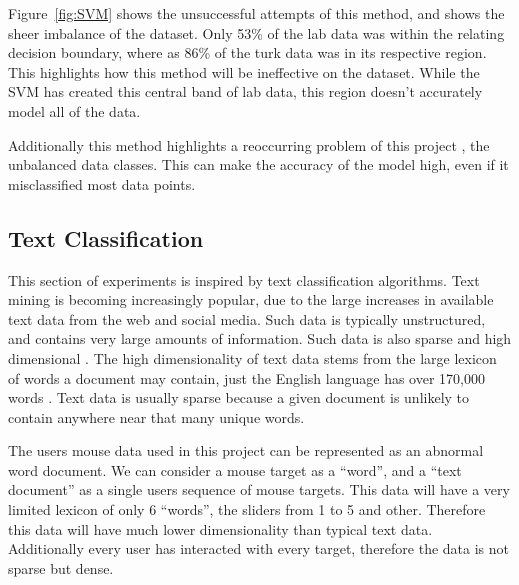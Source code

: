 \documentclass{article}
\begin{document}
Figure~\ref{fig:SVM} shows the unsuccessful attempts of this method, and shows the sheer imbalance of the dataset.
Only 53\% of the lab data was within the relating decision boundary, where as 86\% of the turk data was in its respective region.
This highlights how this method will be ineffective on the dataset.
While the SVM has created this central band of lab data, this region doesn't accurately model all of the data. 

Additionally this method highlights a reoccurring problem of this project
, the unbalanced data classes.
This can make the accuracy of the model high, even if it misclassified most data points.




\subsection{Text Classification}


This section of experiments is inspired by text classification algorithms.
Text mining is becoming increasingly popular, due to the large increases in available text data from the web and social media.
Such data is typically unstructured, and contains very large amounts of information.
Such data is also sparse and high dimensional \cite{aggarwal2012introduction}.
The high dimensionality of text data stems from the large lexicon of words a document may contain, just the English language has over 170,000 words \cite{BBC2018How}.
Text data is usually sparse because a given document is unlikely to contain anywhere near that many unique words.

The users mouse data used in this project can be represented as an abnormal word document.
We can consider a mouse target as a ``word'', and a ``text document'' as a single users sequence of mouse targets.
This data will have a very limited lexicon of only 6 ``words'', the sliders from 1 to 5 and other.
Therefore this data will have much lower dimensionality than typical text data.
Additionally every user has interacted with every target, therefore the data is not sparse but dense.
\end{document}
